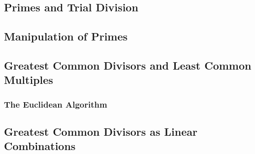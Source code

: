     \subsection{Primes and Trial Division}

    \subsection{Manipulation of Primes}

    \subsection{Greatest Common Divisors and Least Common Multiples}

    \subsubsection*{The Euclidean Algorithm}

    \subsection{Greatest Common Divisors as Linear Combinations}
